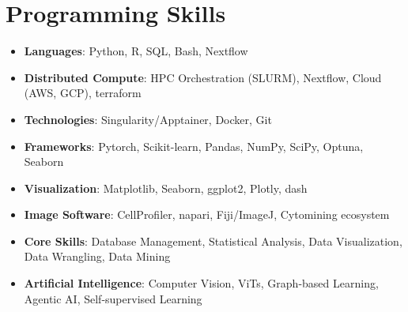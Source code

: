 \documentclass[10.5pt,letterpaper]{article}
\newcommand{\resumeSubHeadingListStart}{\begin{itemize}[leftmargin=0pt,label={},itemsep=2pt,topsep=2pt,parsep=0pt]}
\newcommand{\resumeSubHeadingListEnd}{\end{itemize}}
\begin{document}
\section{Programming Skills}
 \resumeSubHeadingListStart
   \item{
     \textbf{Languages}{: Python, R, SQL, Bash, Nextflow}
    }
   \item{
     \textbf{Distributed Compute}{: HPC Orchestration (SLURM), Nextflow, Cloud (AWS, GCP), terraform}
    }
   \item{
     \textbf{Technologies}{: Singularity/Apptainer, Docker, Git}
    }
   \item{
     \textbf{Frameworks}{: Pytorch, Scikit-learn, Pandas, NumPy, SciPy, Optuna, Seaborn}
    }
   \item{
     \textbf{Visualization}{: Matplotlib, Seaborn, ggplot2, Plotly, dash}
    }
   \item{
     \textbf{Image Software}{: CellProfiler, napari, Fiji/ImageJ, Cytomining ecosystem}
    }
   \item{
     \textbf{Core Skills}{: Database Management, Statistical Analysis, Data Visualization, Data Wrangling, Data Mining}
    }
   \item{
     \textbf{Artificial Intelligence}{: Computer Vision, ViTs, Graph-based Learning, Agentic AI, Self-supervised Learning}
    }
 \resumeSubHeadingListEnd

\end{document}
